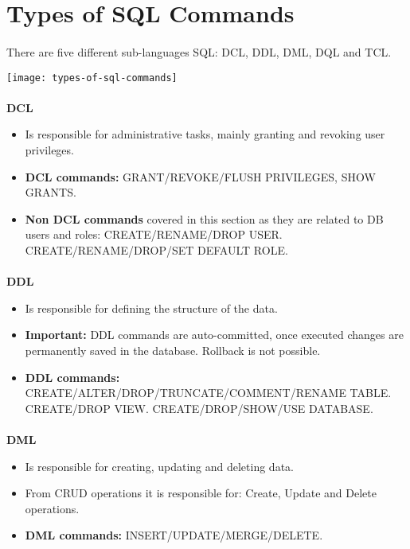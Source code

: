 \section{Types of SQL Commands}
\paragraph{} There are five different sub-languages \acs{SQL}: \acs{DCL}, \acs{DDL}, \acs{DML}, \acs{DQL} and \acs{TCL}.
\begin{center}
	\texttt{[image: types-of-sql-commands]}
\end{center}
\paragraph{} \textbf{\acf{DCL}}
\begin{itemize}
	\item Is responsible for administrative tasks, mainly granting and revoking user privileges.
	\item \textbf{\acs{DCL} commands:}
	\subitem GRANT/REVOKE/FLUSH PRIVILEGES, SHOW GRANTS.
	\item \textbf{Non \acs{DCL} commands} covered in this section as they are related to \acs{DB} users and roles:
	\subitem CREATE/RENAME/DROP USER.
	\subitem CREATE/RENAME/DROP/SET DEFAULT ROLE.
\end{itemize}
\paragraph{} \textbf{\acf{DDL}}
\begin{itemize}
	\item Is responsible for defining the structure of the data.
	\item \textbf{Important:} \acs{DDL} commands are auto-committed, once executed changes are permanently saved in the database. Rollback is not possible.
	\item \textbf{\acs{DDL} commands:}
	\subitem CREATE/ALTER/DROP/TRUNCATE/COMMENT/RENAME TABLE.
	\subitem CREATE/DROP VIEW.
	\subitem CREATE/DROP/SHOW/USE DATABASE.
\end{itemize}
\paragraph{} \textbf{\acf{DML}}
\begin{itemize}
	\item Is responsible for creating, updating and deleting data.
	\item From \acs{CRUD} operations it is responsible for: Create, Update and Delete operations.
	\item \textbf{\acs{DML} commands:}
	\subitem INSERT/UPDATE/MERGE/DELETE.
\end{itemize}
